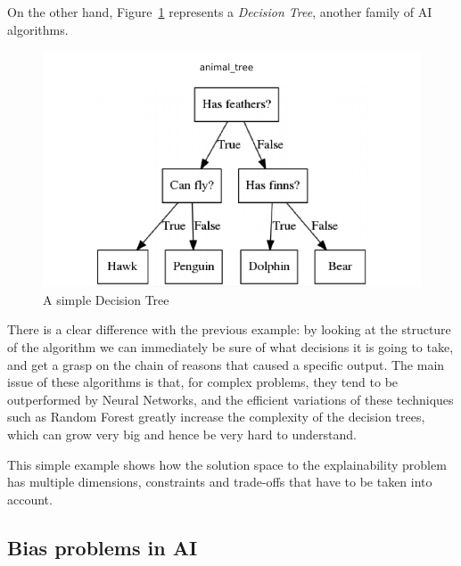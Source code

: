 \documentclass[conference]{IEEEtran}
\newcommand{\cit}[1][]{\todo[tickmarkheight=0.2cm]{cit #1}}
\begin{document}
On the other hand, Figure~\ref{fig:dectree} represents a \textit{Decision Tree},
another family of AI algorithms.
\begin{figure}[ht!] \centering
    \includegraphics[width=0.9\linewidth]{images/dectree} \caption{A simple
        Decision Tree} \label{fig:dectree} \end{figure}

There is a clear difference with the previous example: by looking at the structure of the algorithm we can immediately be sure of what decisions it is going to take, and get a grasp on the chain of reasons that caused a specific output. The main issue of these algorithms is that, for complex problems, they tend to be outperformed by Neural Networks, and the efficient variations of these techniques such as Random Forest greatly increase the complexity of the decision trees, which can grow very big and hence be very hard to understand.

This simple example shows how the solution space to the explainability problem
has multiple dimensions, constraints and trade-offs that have to be taken into
account.

\subsection{Bias problems in AI}
\label{sec:bias}



\end{document}
